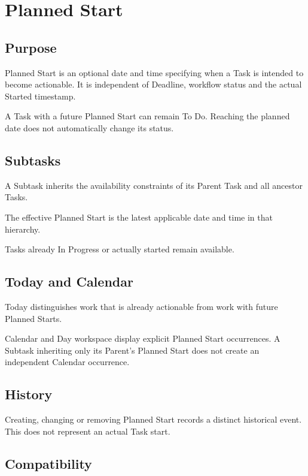 \documentclass{testudomanual}
\begin{document}
\chapter{Planned Start}

\section{Purpose}

Planned Start is an optional date and time specifying when a Task
is intended to become actionable. It is independent of Deadline,
workflow status and the actual Started timestamp.

A Task with a future Planned Start can remain To Do. Reaching the
planned date does not automatically change its status.

\section{Subtasks}

A Subtask inherits the availability constraints of its Parent Task
and all ancestor Tasks.

The effective Planned Start is the latest applicable date and time
in that hierarchy.

Tasks already In Progress or actually started remain available.

\section{Today and Calendar}

Today distinguishes work that is already actionable from work with
future Planned Starts.

Calendar and Day workspace display explicit Planned Start occurrences.
A Subtask inheriting only its Parent's Planned Start does not create
an independent Calendar occurrence.

\section{History}

Creating, changing or removing Planned Start records a distinct
historical event. This does not represent an actual Task start.

\section{Compatibility}
\end{document}
